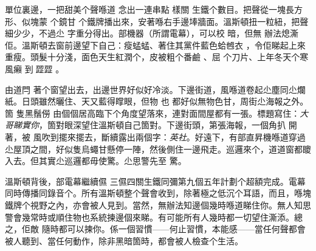 單位裏邊，一把甜美个聲喺道
%
念出一連串點
%
樣關
%
生鐵个數目。把聲從一塊長方形、似塊蒙
%
个鏡甘
%
个鐵牌播出來，安著喺右手邊埲牆面。溫斯頓扭一粒紐，把聲細少少，不過尐
%
字重分得出。部機器（所謂電幕），可以校
%
暗，但無
%
辦法熄澌
%
佢。溫斯頓去窗前邊望下自己：瘦蜢蜢、著住其黨件藍色蛤乸衣
%
，令佢睇起上來
%
重瘦。頭髮十分淺，面色天生紅潤个，皮被粗个番鹼
%
、屈
%
个刀片、上年冬天个寒風癩
%
到𩰶歰歰
%
。

由道閂%
%
著个窗望出去，出邊世界好似好冷淡。下邊街道，風喺道卷起尐塵同尐爛紙。日頭雖然曬住、天又藍得𥋇眼，但物
%
也
%
都好似無物色甘，周街尐海報之外。箇
%
隻黑鬚僗
%
由個個居高臨下个角度望落來，連對面間屋都有一張。標題寫住：\emph{大哥睇實你}，箇對眼深望住溫斯頓自己箇對。下邊街頭，第張海報，一個角扒
%
開著，被
%
風吹到擺來擺去，斷續露出兩個字：\emph{英社}。好遠下，有部直昇機喺道穿過尐屋頂之間，好似隻烏蠅甘懸停一陣，然後側住一邊飛走。巡邏來个，道道窗都𥊙
%
入去。但其實尐巡邏都毋使驚。尐思警先至
%
驚。

溫斯頓背後，部電幕繼續儑
%
三儑四關生鐵同彌第九個五年計劃个超額完成。電幕同時傳播同錄音个。所有溫斯頓整个聲會收到，除著極之低沉个耳語，而且，喺塊鐵牌个視野之內，亦會被人見到。當然，無辦法知邊個幾時喺道睇住你。無人知思警會幾常時或順住物也系統揀邊個來睇。有可能所有人幾時都一切望住澌添。總之，佢敵
%
隨時都可以揀你。係一個習慣——何止習慣，本能感——當任何聲都會被人聽到、當任何動作，除非黑暗箇時，都會被人檢查个生活。

